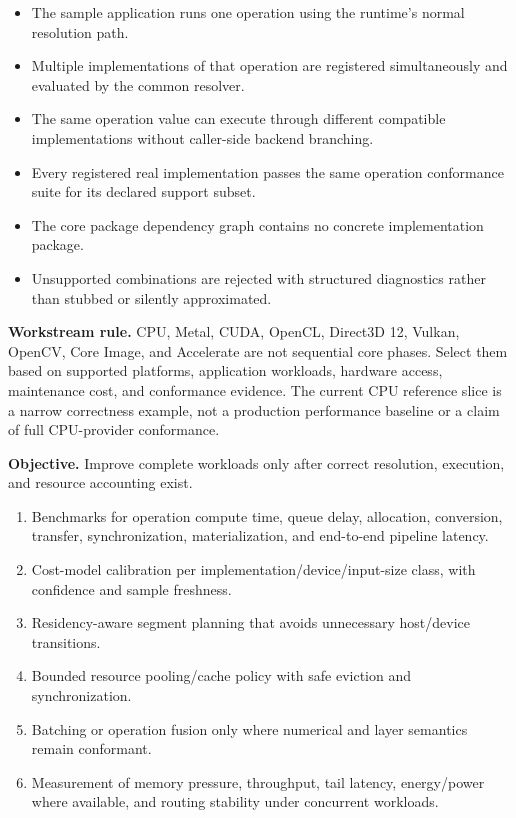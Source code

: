 \exitcriteria
\begin{itemize}
  \item The sample application runs one operation using the runtime's normal resolution path.
  \item Multiple implementations of that operation are registered simultaneously and evaluated by the common resolver.
  \item The same operation value can execute through different compatible implementations without caller-side backend branching.
  \item Every registered real implementation passes the same operation conformance suite for its declared support subset.
  \item The core package dependency graph contains no concrete implementation package.
  \item Unsupported combinations are rejected with structured diagnostics rather than stubbed or silently approximated.
\end{itemize}

\textbf{Workstream rule.} CPU, Metal, CUDA, OpenCL, Direct3D 12, Vulkan, OpenCV, Core Image, and Accelerate are not sequential core phases. Select them based on supported platforms, application workloads, hardware access, maintenance cost, and conformance evidence. The current CPU reference slice is a narrow correctness example, not a production performance baseline or a claim of full CPU-provider conformance.


\textbf{Objective.} Improve complete workloads only after correct resolution, execution, and resource accounting exist.

\deliverables
\begin{enumerate}
  \item Benchmarks for operation compute time, queue delay, allocation, conversion, transfer, synchronization, materialization, and end-to-end pipeline latency.
  \item Cost-model calibration per implementation/device/input-size class, with confidence and sample freshness.
  \item Residency-aware segment planning that avoids unnecessary host/device transitions.
  \item Bounded resource pooling/cache policy with safe eviction and synchronization.
  \item Batching or operation fusion only where numerical and layer semantics remain conformant.
  \item Measurement of memory pressure, throughput, tail latency, energy/power where available, and routing stability under concurrent workloads.
\end{enumerate}


